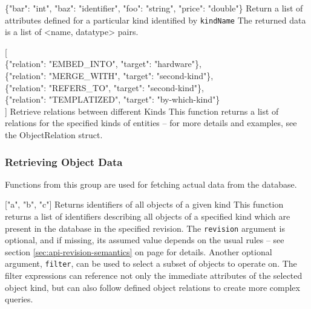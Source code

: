 \documentclass{article}
\begin{document}
    {\{"bar": "int", "baz": "identifier", "foo": "string", "price": "double"\}}
    {Return a list of attributes defined for a particular kind identified by {\tt kindName}}
    {The returned data is a list of \textless name, datatype\textgreater { }pairs.  \deskaUnsortedRes}

    { [ \\
            \{"relation": "EMBED\_INTO", "target": "hardware"\}, \\
            \{"relation": "MERGE\_WITH", "target": "second-kind"\}, \\
            \{"relation": "REFERS\_TO", "target": "second-kind"\}, \\
            \{"relation": "TEMPLATIZED", "target": "by-which-kind"\} \\
            ]}
    {Retrieve relations between different Kinds}
    {This function returns a list of relations for the specified kinds of entities -- for more details and examples, see
    the ObjectRelation struct.  \deskaUnsortedRes}

\subsubsection{Retrieving Object Data}
\label{sec:api-group-data-retrieval}

Functions from this group are used for fetching actual data from the database.

    { ["a", "b", "c"] }
    {Returns identifiers of all objects of a given kind}
    {This function returns a list of identifiers describing all objects of a specified kind which are present in the
    database in the specified revision.  The {\tt revision} argument is optional, and if missing, its assumed value
    depends on the usual rules -- see section \ref{sec:api-revision-semantics} on page
    \pageref{sec:api-revision-semantics} for details.  Another optional argument, {\tt filter}, can be used to select
    a subset of objects to operate on.  The filter expressions can reference not only the immediate attributes of the
    selected object kind, but can also follow defined object relations to create more complex queries.  \deskaUnsortedRes}
\end{document}
